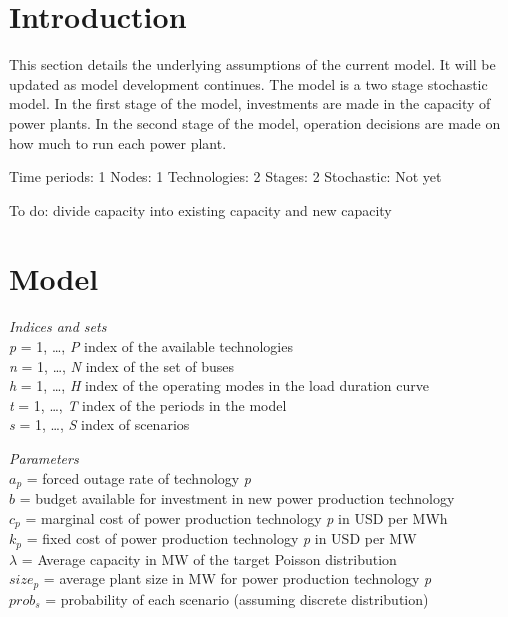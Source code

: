 \documentclass[10pt]{amsart}
\begin{document}
\section{Introduction}
This section details the underlying assumptions of the current model. 
It will be updated as model development continues.
The model is a two stage stochastic model.
In the first stage of the model, investments are made in the capacity of power plants.
In the second stage of the model, operation decisions are made on how much to run each power plant. 

Time periods: 1
Nodes: 1
Technologies: 2
Stages: 2
Stochastic: Not yet

To do:
divide capacity into existing capacity and new capacity

\section{Model}
\begin{flushleft}
\textit{Indices and sets}\\
\textit{p} = 1, \ldots, \textit{P} index of the available technologies \\ 
\textit{n} = 1, \ldots, \textit{N} index of the set of buses \\
\textit{h} = 1, \ldots, \textit{H} index of the operating modes in the load duration curve \\
\textit{t} = 1, \ldots, \textit{T} index of the periods in the model \\
\textit{s} = 1, \ldots, \textit{S} index of scenarios \\
\end{flushleft}

\begin{flushleft}
\textit{Parameters} \\
$a_{p}$ = forced outage rate of technology \textit{p} \\
$b$ = budget available for investment in new power production technology \\
$c_{p}$ = marginal cost of power production technology \textit{p} in USD per MWh \\
$k_{p}$ = fixed cost of power production technology \textit{p} in USD per MW \\
$\lambda$ = Average capacity in MW of the target Poisson distribution \\ 
$size_{p}$ = average plant size in MW for power production technology \textit{p} \\
$prob_{s}$ = probability of each scenario (assuming discrete distribution) \\
\end{flushleft}
\end{document}
